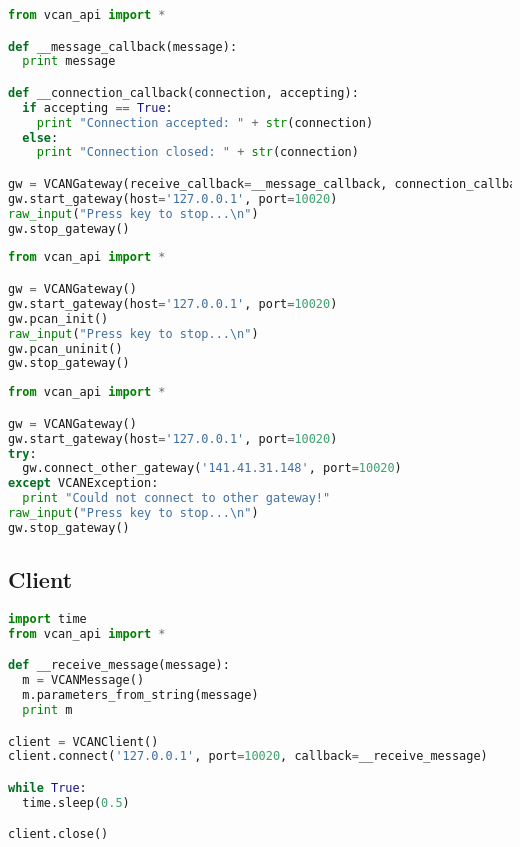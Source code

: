 \begin{lstlisting}[frame=single, language=Python, basicstyle=\footnotesize, caption={Gateway mit Callbacks}, label={lst:bsp_gateway2}]
from vcan_api import *

def __message_callback(message):
  print message

def __connection_callback(connection, accepting):
  if accepting == True:
    print "Connection accepted: " + str(connection)
  else:
    print "Connection closed: " + str(connection)

gw = VCANGateway(receive_callback=__message_callback, connection_callback=__connection_callback)
gw.start_gateway(host='127.0.0.1', port=10020)
raw_input("Press key to stop...\n")
gw.stop_gateway()
\end{lstlisting}

\begin{lstlisting}[frame=single, language=Python, basicstyle=\footnotesize, caption={Gateway mit PCAN-Anbindung}, label={lst:bsp_gateway3}]
from vcan_api import *

gw = VCANGateway()
gw.start_gateway(host='127.0.0.1', port=10020)
gw.pcan_init()
raw_input("Press key to stop...\n")
gw.pcan_uninit()
gw.stop_gateway()
\end{lstlisting}

\begin{lstlisting}[frame=single, language=Python, basicstyle=\footnotesize, caption={Gateway mit Verbindung zu anderem Gateway}, label={lst:bsp_gateway4}]
from vcan_api import *

gw = VCANGateway()
gw.start_gateway(host='127.0.0.1', port=10020)
try:
  gw.connect_other_gateway('141.41.31.148', port=10020)
except VCANException:
  print "Could not connect to other gateway!"
raw_input("Press key to stop...\n")
gw.stop_gateway()
\end{lstlisting}

\subsection{Client}
\label{sec:vcan_client_beispiele}
\begin{lstlisting}[frame=single, language=Python, basicstyle=\footnotesize, caption={Empfangsclient via Callback}, label={lst:bsp_client1}]
import time
from vcan_api import *

def __receive_message(message):
  m = VCANMessage()
  m.parameters_from_string(message)
  print m

client = VCANClient()
client.connect('127.0.0.1', port=10020, callback=__receive_message)

while True:
  time.sleep(0.5)

client.close()
\end{lstlisting}

